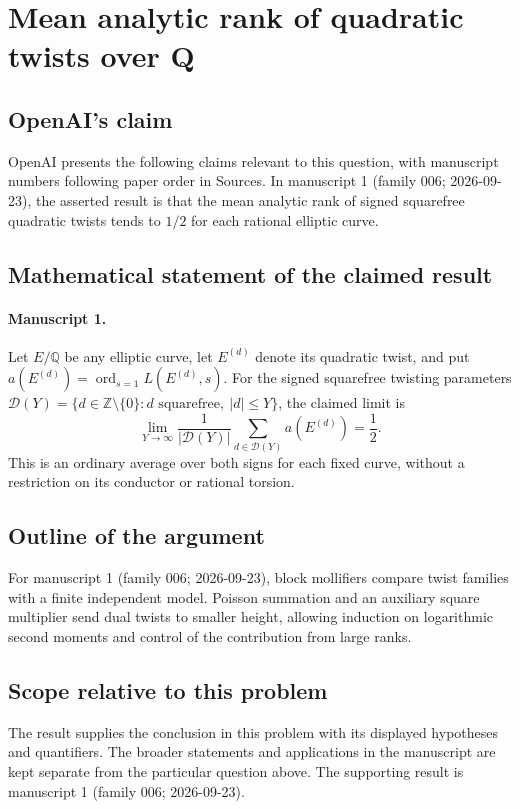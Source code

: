 \documentclass[11pt]{article}
\begin{document}
\section*{Mean analytic rank of quadratic twists over Q}

\subsection{OpenAI's claim}
OpenAI presents the following claims relevant to this question, with manuscript numbers following paper order in Sources. In manuscript 1 (family 006; 2026-09-23), the asserted result is that the mean analytic rank of signed squarefree quadratic twists tends to $1/2$ for each rational elliptic curve.

\subsection{Mathematical statement of the claimed result}
\paragraph{Manuscript 1.}
Let $E/\mathbb Q$ be any elliptic curve, let $E^{(d)}$ denote its quadratic twist, and put $a(E^{(d)})=\operatorname{ord}_{s=1}L(E^{(d)},s)$. For the signed squarefree twisting parameters $\mathcal D(Y)=\{d\in\mathbb Z\setminus\{0\}:d\text{ squarefree},\ |d|\le Y\}$, the claimed limit is
\[
 \lim_{Y\to\infty}\frac1{|\mathcal D(Y)|}
       \sum_{d\in\mathcal D(Y)}a(E^{(d)})=\frac12.
\]
This is an ordinary average over both signs for each fixed curve, without a restriction on its conductor or rational torsion.

\subsection{Outline of the argument}
For manuscript 1 (family 006; 2026-09-23), block mollifiers compare twist families with a finite independent model. Poisson summation and an auxiliary square multiplier send dual twists to smaller height, allowing induction on logarithmic second moments and control of the contribution from large ranks.

\subsection{Scope relative to this problem}
The result supplies the conclusion in this problem with its displayed hypotheses and quantifiers. The broader statements and applications in the manuscript are kept separate from the particular question above. The supporting result is manuscript 1 (family 006; 2026-09-23).
\end{document}
